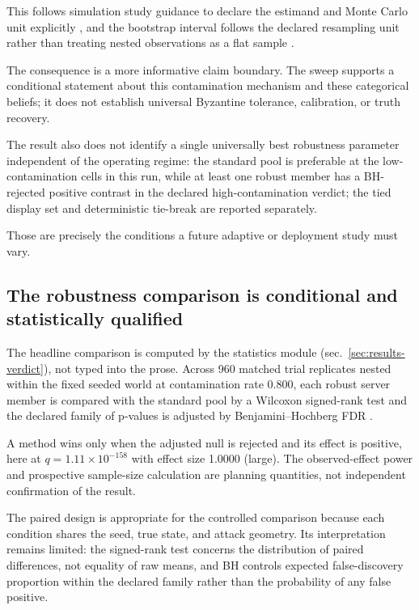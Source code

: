 \documentclass[
  english,
]{article}
\theoremstyle{plain}
\theoremstyle{definition}
\theoremstyle{remark}
\theoremstyle{definition}
\begin{document}
This follows simulation study guidance to declare the estimand and Monte
Carlo unit explicitly \citep{morris2019simulation, koehler2009mcse}, and
the bootstrap interval follows the declared resampling unit rather than
treating nested observations as a flat sample
\citep{loy2021lmeresampler}.

The consequence is a more informative claim boundary. The sweep supports
a conditional statement about this contamination mechanism and these
categorical beliefs; it does not establish universal Byzantine
tolerance, calibration, or truth recovery.

The result also does not identify a single universally best robustness
parameter independent of the operating regime: the standard pool is
preferable at the low-contamination cells in this run, while at least
one robust member has a BH-rejected positive contrast in the declared
high-contamination verdict; the tied display set and deterministic
tie-break are reported separately.

Those are precisely the conditions a future adaptive or deployment study
must vary.

\subsection{The robustness comparison is conditional and statistically
qualified}\label{sec:discussion-verdict}

The headline comparison is computed by the statistics module
(sec.~\ref{sec:results-verdict}), not typed into the prose. Across 960
matched trial replicates nested within the fixed seeded world at
contamination rate 0.800, each robust server member is compared with the
standard pool by a Wilcoxon signed-rank test
\citep{wilcoxon1945individual} and the declared family of p-values is
adjusted by Benjamini--Hochberg FDR \citep{benjamini1995controlling}.

A method wins only when the adjusted null is rejected and its effect is
positive, here at \(q = 1.11 \times 10^{-158}\) with effect size 1.0000
(large). The observed-effect power and prospective sample-size
calculation are planning quantities, not independent confirmation of the
result.

The paired design is appropriate for the controlled comparison because
each condition shares the seed, true state, and attack geometry. Its
interpretation remains limited: the signed-rank test concerns the
distribution of paired differences, not equality of raw means, and BH
controls expected false-discovery proportion within the declared family
rather than the probability of any false positive.
\end{document}
